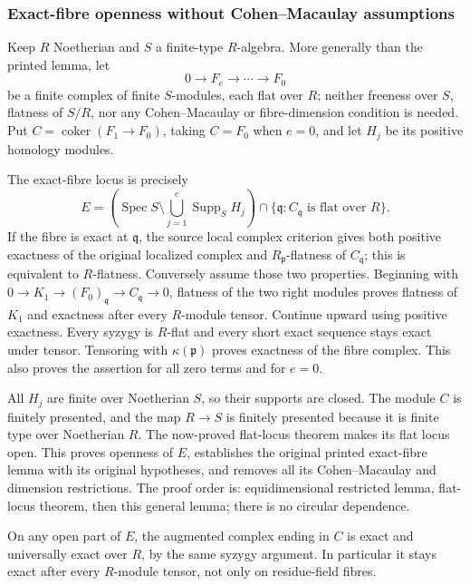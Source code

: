 \subsubsection{Exact-fibre openness without Cohen--Macaulay assumptions}\label{algebra-proof-039-exact-fibre-openness-without-cohenmacaulay-assumptions}

Keep \(R\) Noetherian and \(S\) a finite-type \(R\)-algebra. More generally than the printed lemma, let \[
0\longrightarrow F_e\longrightarrow\cdots\longrightarrow F_0
\] be a finite complex of finite \(S\)-modules, each flat over \(R\); neither freeness over \(S\), flatness of \(S/R\), nor any Cohen--Macaulay or fibre-dimension condition is needed. Put \(C=\operatorname{coker}(F_1\to F_0)\), taking \(C=F_0\) when \(e=0\), and let \(H_j\) be its positive homology modules.

The exact-fibre locus is precisely \[
E=
\left(\operatorname{Spec}S\setminus\bigcup_{j=1}^e\operatorname{Supp}_S H_j\right)
\cap
\{\mathfrak q:C_{\mathfrak q}\text{ is flat over }R\}.
\] If the fibre is exact at \(\mathfrak q\), the source local complex criterion gives both positive exactness of the original localized complex and \(R_{\mathfrak p}\)-flatness of \(C_{\mathfrak q}\); this is equivalent to \(R\)-flatness. Conversely assume those two properties. Beginning with \(0\to K_1\to(F_0)_{\mathfrak q}\to C_{\mathfrak q}\to0\), flatness of the two right modules proves flatness of \(K_1\) and exactness after every \(R\)-module tensor. Continue upward using positive exactness. Every syzygy is \(R\)-flat and every short exact sequence stays exact under tensor. Tensoring with \(\kappa(\mathfrak p)\) proves exactness of the fibre complex. This also proves the assertion for all zero terms and for \(e=0\).

All \(H_j\) are finite over Noetherian \(S\), so their supports are closed. The module \(C\) is finitely presented, and the map \(R\to S\) is finitely presented because it is finite type over Noetherian \(R\). The now-proved flat-locus theorem makes its flat locus open. This proves openness of \(E\), establishes the original printed exact-fibre lemma with its original hypotheses, and removes all its Cohen--Macaulay and dimension restrictions. The proof order is: equidimensional restricted lemma, flat-locus theorem, then this general lemma; there is no circular dependence.

On any open part of \(E\), the augmented complex ending in \(C\) is exact and universally exact over \(R\), by the same syzygy argument. In particular it stays exact after every \(R\)-module tensor, not only on residue-field fibres.

